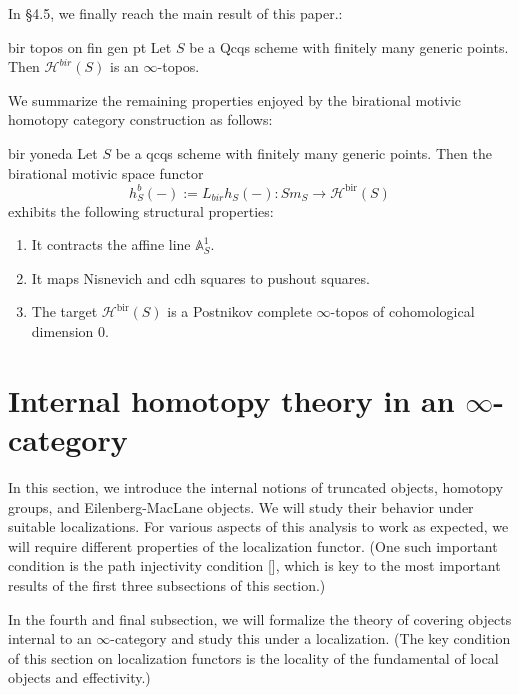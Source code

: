 In \S4.5, we finally reach the main result of this paper.: 
\begin{recall*}{bir topos on fin gen pt}
    Let $S$ be a Qcqs scheme with finitely many generic points. Then $\mathcal{H}^{bir}(S)$ is an $\infty$-topos.
\end{recall*}
We summarize the remaining properties enjoyed by the birational motivic homotopy category construction as follows:
\begin{recall*}{bir yoneda}
Let $S$ be a qcqs scheme with finitely many generic points. Then the birational motivic space functor$$h^b_S(-):=L_{bir}h_S(-): Sm_S \to \mathcal{H}^{\mathrm{bir}}(S)$$ exhibits the following structural properties:
\begin{enumerate}
    \item It contracts the affine line $\mathbb{A}^1_S$.
    \item It maps Nisnevich and cdh squares to pushout squares.
    \item The target $\mathcal{H}^{\mathrm{bir}}(S)$ is a Postnikov complete $\infty$-topos of cohomological dimension $0$.
\end{enumerate}

\end{recall*}

\section{Internal homotopy theory in an \texorpdfstring{$\infty$}{}-category}
In this section, we introduce the internal notions of truncated objects, homotopy groups, and Eilenberg-MacLane objects. We will study their behavior under suitable localizations. For various aspects of this analysis to work as expected, we will require different properties of the localization functor. (One such important condition is the path injectivity condition [], which is key to the most important results of the first three subsections of this section.) 


In the fourth and final subsection, we will formalize the theory of covering objects internal to an $\infty$-category and study this under a localization. (The key condition of this section on localization functors is the locality of the fundamental of local objects and effectivity.)

